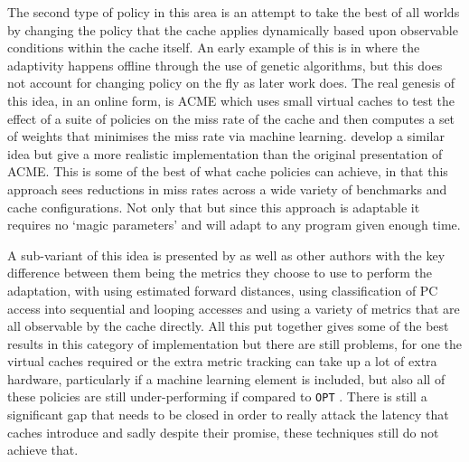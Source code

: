 The second type of policy in this area is an attempt to take the best of all worlds by changing the policy that the cache applies dynamically based upon observable conditions within the cache itself. An early example of this is in \citet{altmanNovelMethodologyUsing1993} where the adaptivity happens offline through the use of genetic algorithms, but this does not account for changing policy on the fly as later work does. The real genesis of this idea, in an online form, is ACME \cite{ariACMEAdaptiveCaching2002, gramacyAdaptiveCachingRefetching2003, riaz-ud-dinAcmeDBAdaptiveCaching2006} which uses small virtual caches to test the effect of a suite of policies on the miss rate of the cache and then computes a set of weights that minimises the miss rate via machine learning. \citet{subramanianAdaptiveCachesEffective2006} develop a similar idea but give a more realistic implementation than the original presentation of ACME. This is some of the best of what cache policies can achieve, in that this approach sees reductions in miss rates across a wide variety of benchmarks and cache configurations. Not only that but since this approach is adaptable it requires no `magic parameters' and will adapt to any program given enough time. 

A sub-variant of this idea is presented by \citet{jongmoochoiDesignImplementationPerformance2002} as well as other authors \cite{smaragdakisGeneralAdaptiveReplacement2004, aguilarGeneralAdaptiveCache2004, aguilarCoherenceReplacementProtocolWeb2006, changAdaptiveBufferCache2016, changPARCNovelOS2018} with the key difference between them being the metrics they choose to use to perform the adaptation, with \citeauthor{jongmoochoiDesignImplementationPerformance2002} using estimated forward distances, \citeauthor{changAdaptiveBufferCache2016} using classification of PC access into sequential and looping accesses and  \citeauthor{aguilarGeneralAdaptiveCache2004} using a variety of metrics that are all observable by the cache directly. All this put together gives some of the best results in this category of implementation but there are still problems, for one the virtual caches required or the extra metric tracking can take up a lot of extra hardware, particularly if a machine learning element is included, but also all of these policies are still under-performing if compared to \texttt{OPT} \cite{beladyStudyReplacementAlgorithms1966}. There is still a significant gap that needs to be closed in order to really attack the latency that caches introduce and sadly despite their promise, these techniques still do not achieve that.

